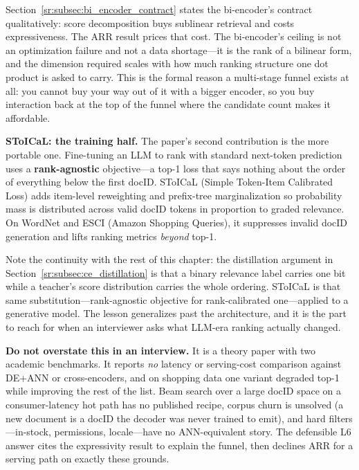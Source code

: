 \begin{keyinsight}
Section~\ref{sr:subsec:bi_encoder_contract} states the bi-encoder's contract qualitatively: score decomposition buys sublinear retrieval and costs expressiveness. The ARR result prices that cost. The bi-encoder's ceiling is not an optimization failure and not a data shortage---it is the rank of a bilinear form, and the dimension required scales with how much ranking structure one dot product is asked to carry. This is the formal reason a multi-stage funnel exists at all: you cannot buy your way out of it with a bigger encoder, so you buy interaction back at the top of the funnel where the candidate count makes it affordable.
\end{keyinsight}

\textbf{SToICaL: the training half.} The paper's second contribution is the more portable one. Fine-tuning an LLM to rank with standard next-token prediction uses a \textbf{rank-agnostic} objective---a top-1 loss that says nothing about the order of everything below the first docID. SToICaL (Simple Token-Item Calibrated Loss) adds item-level reweighting and prefix-tree marginalization so probability mass is distributed across valid docID tokens in proportion to graded relevance. On WordNet and ESCI (Amazon Shopping Queries), it suppresses invalid docID generation and lifts ranking metrics \textit{beyond} top-1.

Note the continuity with the rest of this chapter: the distillation argument in Section~\ref{sr:subsec:ce_distillation} is that a binary relevance label carries one bit while a teacher's score distribution carries the whole ordering. SToICaL is that same substitution---rank-agnostic objective for rank-calibrated one---applied to a generative model. The lesson generalizes past the architecture, and it is the part to reach for when an interviewer asks what LLM-era ranking actually changed.

\begin{warningbox}
\textbf{Do not overstate this in an interview.} It is a theory paper with two academic benchmarks. It reports \textit{no} latency or serving-cost comparison against DE+ANN or cross-encoders, and on shopping data one variant degraded top-1 while improving the rest of the list. Beam search over a large docID space on a consumer-latency hot path has no published recipe, corpus churn is unsolved (a new document is a docID the decoder was never trained to emit), and hard filters---in-stock, permissions, locale---have no ANN-equivalent story. The defensible L6 answer cites the expressivity result to explain the funnel, then declines ARR for a serving path on exactly these grounds.
\end{warningbox}

